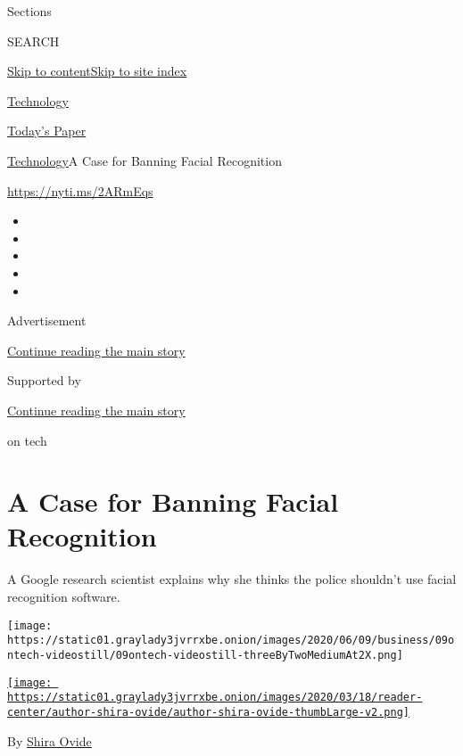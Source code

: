 Sections

SEARCH

\protect\hyperlink{site-content}{Skip to
content}\protect\hyperlink{site-index}{Skip to site index}

\href{https://www.nytimes3xbfgragh.onion/section/technology}{Technology}

\href{https://myaccount.nytimes3xbfgragh.onion/auth/login?response_type=cookie\&client_id=vi}{}

\href{https://www.nytimes3xbfgragh.onion/section/todayspaper}{Today's
Paper}

\href{/section/technology}{Technology}\textbar{}A Case for Banning
Facial Recognition

\url{https://nyti.ms/2ARmEqs}

\begin{itemize}
\item
\item
\item
\item
\item
\end{itemize}

Advertisement

\protect\hyperlink{after-top}{Continue reading the main story}

Supported by

\protect\hyperlink{after-sponsor}{Continue reading the main story}

on tech

\hypertarget{a-case-for-banning-facial-recognition}{%
\section{A Case for Banning Facial
Recognition}\label{a-case-for-banning-facial-recognition}}

A Google research scientist explains why she thinks the police shouldn't
use facial recognition software.

\texttt{[image: https://static01.graylady3jvrrxbe.onion/images/2020/06/09/business/09ontech-videostill/09ontech-videostill-threeByTwoMediumAt2X.png]}

\href{https://www.nytimes3xbfgragh.onion/by/shira-ovide}{\texttt{[image: https://static01.graylady3jvrrxbe.onion/images/2020/03/18/reader-center/author-shira-ovide/author-shira-ovide-thumbLarge-v2.png]}}

By \href{https://www.nytimes3xbfgragh.onion/by/shira-ovide}{Shira Ovide}

